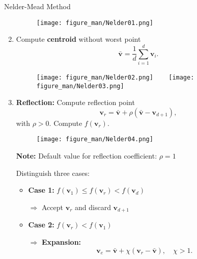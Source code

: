 \documentclass[11pt,compress,t,notes=noshow, xcolor=table]{beamer}
\begin{document}
\begin{vbframe}{Nelder-Mead Method}
\begin{enumerate}
\begin{figure}
\texttt{[image: figure\_man/Nelder01.png]}
\end{figure}

\item Compute \textbf{centroid} without worst point
$$
\bar{\mathbf{v}} = \frac{1}{d} \sum_{i = 1}^d \mathbf{v}_i.
$$

\begin{figure}
\texttt{[image: figure\_man/Nelder02.png]} ~~~ \texttt{[image: figure\_man/Nelder03.png]}
\end{figure}

\framebreak

\item \textbf{Reflection:} Compute reflection point
$$
\mathbf{v}_r = \bar{\mathbf{v}} + \rho (\bar{\mathbf{v}} - \mathbf{v}_{d + 1}),
$$
with $\rho > 0$.
Compute $f(\mathbf{v}_r)$.

\vspace{\baselineskip}

\begin{figure}
    \texttt{[image: figure\_man/Nelder04.png]} 
\end{figure}

\vspace{\baselineskip}

\textbf{Note:} Default value for reflection coefficient: $\rho = 1$

\framebreak

\small
Distinguish three cases:

\begin{itemize}
    \small
    \item \textbf{Case 1:} $f(\mathbf{v}_1) \leq f(\mathbf{v}_r) < f(\mathbf{v}_d)$

        \medskip

        $\Rightarrow$ Accept $\mathbf{v}_r$ and discard $\mathbf{v}_{d + 1}$
\end{itemize}

\medskip

\begin{minipage}{0.57\textwidth}
\begin{itemize}
    \small
    \item \textbf{Case 2:} $f(\mathbf{v}_r) < f(\mathbf{v}_1)$

        \medskip

        $\Rightarrow$ \textbf{Expansion:} 
        \begin{equation*}
            \mathbf{v}_e = \bar{\mathbf{v}} + \chi (\mathbf{v}_{r} - \bar{\mathbf{v}}), \quad \chi > 1.
        \end{equation*}
    

\end{itemize}
\end{minipage}
\end{enumerate}
\end{vbframe}
\end{document}
